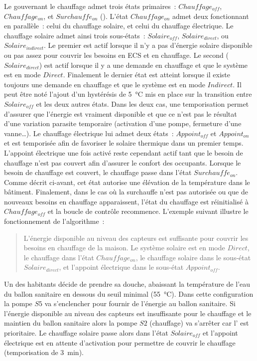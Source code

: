 Le  gouvernant le chauffage admet trois états primaires~: $Chauffage_{off}$,
$Chauffage_{on}$, et $Surchauffe_{on}$ (). L’état
$Chauffage_{on}$ admet deux  fonctionnant en parallèle~: celui du chauffage
solaire, et celui du chauffage électrique. Le chauffage solaire admet ainsi trois sous-états~:
$Solaire_{off}$, $Solaire_{direct}$, ou $Solaire_{indirect}$. Le premier est actif lorsque
il n’y a pas d’énergie solaire disponible ou pas assez pour couvrir les besoins en ECS et
en chauffage. Le second ($Solaire_{direct}$) est actif lorsque il y a une demande en
chauffage et que le système est en mode $Direct$. Finalement le dernier état est atteint
lorsque il existe toujours une demande en chauffage et que le système est en mode
$Indirect$.
Il peut être noté l’ajout d’un hystérésis de \SI{5}{\celsius} mis en place sur la
transition entre $Solaire_{off}$ et les deux autres états. Dans les deux cas, une
temporisation permet d’assurer que l’énergie est vraiment disponible et que ce n’est pas
le résultat d’une variation parasite temporaire (activation d’une pompe, fermeture d’une
vanne\dots). Le chauffage électrique lui admet deux états~: $Appoint_{off}$ et
$Appoint_{on}$ et est temporisée afin de favoriser le solaire thermique dans un premier temps.
L’appoint électrique une fois activé reste cependant actif tant que le besoin de chauffage n’est pas couvert
afin d’assurer le confort des occupants.
Lorsque le besoin de chauffage est couvert, le chauffage passe dans l’état
$Surchauffe_{on}$. Comme décrit ci-avant, cet état autorise une élévation de la température
dans le bâtiment. Finalement, dans le cas où la surchauffe n’est pas autorisée ou que de nouveaux
besoins en chauffage apparaissent, l’état du chauffage est réinitialisé à $Chauffage_{off}$
et la boucle de contrôle recommence.
L’exemple suivant illustre le fonctionnement de l’algorithme~:
\blockquote{L’énergie disponible au niveau des capteurs est suffisante pour couvrir les besoins en chauffage de
la maison. Le système solaire est en mode $Direct$, le chauffage dans l’état
$Chauffage_{on}$, le chauffage solaire dans le sous-état $Solaire_{direct}$, et
l’appoint électrique dans le sous-état $Appoint_{off}$.}
Un des habitants décide de prendre sa douche, abaissant la température de l’eau du ballon
sanitaire en dessous du seuil minimal (\SI{55}{\celsius}). Dans cette configuration la
pompe $S5$ va s’enclencher pour fournir de l’énergie au ballon sanitaire. Si l’énergie
disponible au niveau des capteurs est insuffisante pour le chauffage et le maintien du
ballon sanitaire alors la pompe $S2$ (chauffage) va s’arrêter car l’ est prioritaire.
Le chauffage solaire passe alors dans l’état $Solaire_{off}$ et l’appoint électrique est
en attente d’activation pour permettre de couvrir le chauffage (temporisation de
\SI{3}{\minute}).

